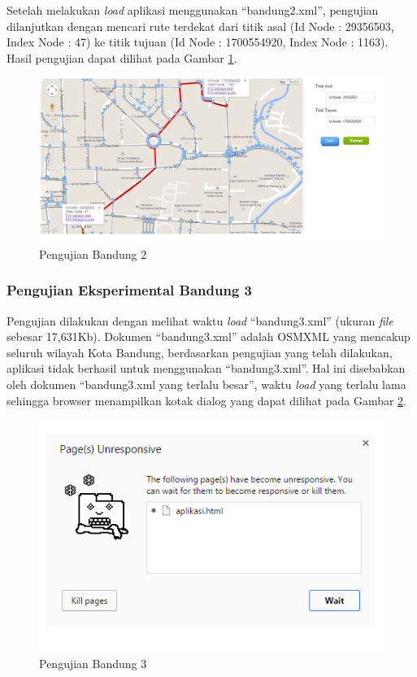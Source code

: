 Setelah melakukan \textit{load} aplikasi menggunakan ``bandung2.xml'', pengujian
dilanjutkan dengan mencari rute terdekat dari titik asal (Id Node : 29356503,
Index Node : 47) ke titik tujuan (Id Node : 1700554920, Index Node : 1163).
Hasil pengujian dapat dilihat pada Gambar \ref{fig:pu_bandung2_rute}.
\clearpage
\begin{figure}[h]
\centering
\includegraphics[scale=0.45]{Gambar/pu_bandung2_rute}
\caption[Pengujian Bandung 2]{Pengujian Bandung 2}
\label{fig:pu_bandung2_rute}
\end{figure}

\subsubsection{Pengujian Eksperimental Bandung 3}
Pengujian dilakukan dengan melihat waktu \textit{load} ``bandung3.xml'' (ukuran
\textit{file} sebesar 17,631Kb). Dokumen ``bandung3.xml'' adalah OSMXML yang
mencakup seluruh wilayah Kota Bandung, berdasarkan pengujian yang telah dilakukan, aplikasi tidak berhasil untuk 
menggunakan ``bandung3.xml''. Hal ini disebabkan oleh dokumen ``bandung3.xml
yang terlalu besar'', waktu \textit{load} yang terlalu lama sehingga browser 
menampilkan kotak dialog yang dapat dilihat pada Gambar
\ref{fig:pu_bandung3}.
\begin{figure}[h]
\centering
\includegraphics[scale=1]{Gambar/pu_bandung3}
\caption[Pengujian Bandung 3]{Pengujian Bandung 3}
\label{fig:pu_bandung3}
\end{figure}

